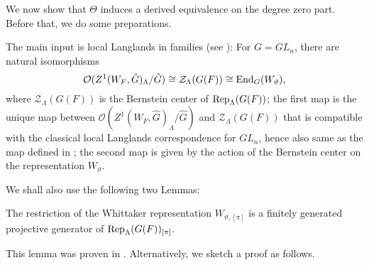 We now show that $\Theta$ induces a derived equivalence on the degree zero part. Before that, we do some preparations.

The main input is local Langlands in families (see \cite{helm2018converse}): For $G=GL_n$, there are natural isomorphisms
$$\mathcal{O}(Z^1(W_F, \hat{G})_{\Lambda}/\hat{G}) \cong \mathcal{Z}_{\Lambda}(G(F)) \cong \operatorname{\operatorname{End}}_{G}(W_{\vartheta}),$$
where $\mathcal{Z}_{\Lambda}(G(F))$ is the Bernstein center of $\operatorname{\operatorname{Rep}}_{\Lambda}(G(F))$; the first map is the unique map between $\mathcal{O}(Z^1(W_F, \hat{G})_{\Lambda}/\hat{G})$ and $\mathcal{Z}_{\Lambda}(G(F))$ that is compatible with the classical local Langlands correspondence for $GL_n$, hence also same as the map defined in \cite[Section VIII.4]{fargues2021geometrization}; the second map is given by the action of the Bernstein center on the representation $W_{\vartheta}$.

We shall also use the following two Lemmas: 

\begin{lemma}\label{Lemma Whittaker is proj gen}
	The restriction of the Whittaker representation $W_{\vartheta, [\pi]}$ is a finitely generated projective generator of $\operatorname{\operatorname{Rep}}_{\Lambda}(G(F))_{[\pi]}$.
\end{lemma}

This lemma was proven in \cite{chan2019bernstein}. Alternatively, we sketch a proof as follows.

